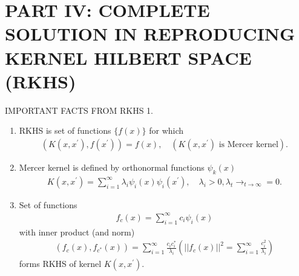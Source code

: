 \documentclass[11pt]{beamer}
\begin{document}
\section{PART IV: COMPLETE SOLUTION IN REPRODUCING KERNEL HILBERT SPACE (RKHS)}
\begin{frame}
{\color{blue}{
\begin{center}
PART IV
\end{center}
\begin{center}
COMPLETE SOLUTION IN REPRODUCING KERNEL HILBERT SPACE (RKHS)
\end{center}
}}
\end{frame}


\begin{frame}{IMPORTANT FACTS FROM RKHS 1.}
\begin{enumerate}
\item RKHS is set of functions $\{f(x)\}$ for which
\begin{align*}
(K(x, x^{\prime}), f(x^{\prime})) = f(x), \quad (K(x, x^{\prime}) \text{ is Mercer kernel}).
\end{align*}
\item Mercer kernel is defined by orthonormal functions $\psi_{k}(x)$
\begin{align*}
K(x, x^{\prime}) = \sum_{i=1}^{\infty}\lambda_{i}\psi_{i}(x)\psi_{i}(x^{\prime}), \quad \lambda_{i} > 0, \lambda_{t} \rightarrow_{t \rightarrow \infty} = 0.
\end{align*}
\item Set of functions
\begin{align*}
f_{c}(x) = \sum_{i=1}^{\infty}c_{i}\psi_{i}(x)
\end{align*}
with inner product (and norm)
\begin{align*}
(f_{c}(x), f_{c^{*}}(x)) = \sum_{i=1}^{\infty}\frac{c_{i}c_{i}^{*}}{\lambda_{i}} \left( ||f_{c}(x)||^{2} = \sum_{i=1}^{\infty}\frac{c_{i}^{2}}{\lambda_{i}} \right)
\end{align*}
forms RKHS of kernel $K(x, x^{\prime})$.
\end{enumerate}
\end{frame}
\end{document}
